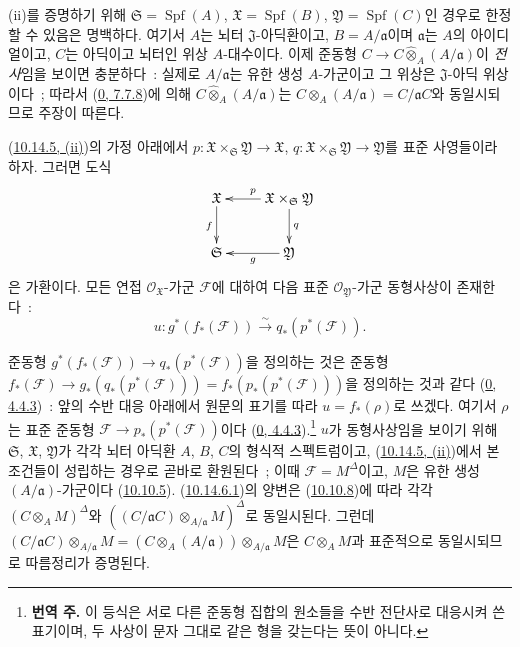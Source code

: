 (ii)를 증명하기 위해 $\mathfrak{S}=\operatorname{Spf}(A)$,
$\mathfrak{X}=\operatorname{Spf}(B)$,
$\mathfrak{Y}=\operatorname{Spf}(C)$인 경우로 한정할 수 있음은
명백하다. 여기서 $A$는 뇌터 $\mathfrak{J}$-아딕환이고,
$B=A/\mathfrak{a}$이며 $\mathfrak{a}$는 $A$의 아이디얼이고,
$C$는 아딕이고 뇌터인 위상 $A$-대수이다. 이제 준동형
$C\to C\widehat{\otimes}_A(A/\mathfrak{a})$이 \emph{전사}임을
보이면 충분하다~: 실제로 $A/\mathfrak{a}$는 유한 생성 $A$-가군이고
그 위상은 $\mathfrak{J}$-아딕 위상이다~; 따라서
(\hyperref[0.7.7.8-ko]{0, 7.7.8})에 의해
$C\widehat{\otimes}_A(A/\mathfrak{a})$는
$C\otimes_A(A/\mathfrak{a})=C/\mathfrak{a}C$와 동일시되므로 주장이
따른다.

\begin{corollary}[10.14.6]
\label{I.10.14.6-ko}
(\hyperref[I.10.14.5-ko]{10.14.5, (ii)})의 가정 아래에서
$p:\mathfrak{X}\times_{\mathfrak{S}}\mathfrak{Y}\to\mathfrak{X}$,
$q:\mathfrak{X}\times_{\mathfrak{S}}\mathfrak{Y}\to\mathfrak{Y}$를
표준 사영들이라 하자. 그러면 도식
\[
  \xymatrix{
    \mathfrak{X} \ar[d]_{f}
    & \mathfrak{X}\times_{\mathfrak{S}}\mathfrak{Y}
      \ar[l]_{p} \ar[d]^{q}\\
    \mathfrak{S}
    & \mathfrak{Y} \ar[l]^{g}
  }
\]
은 가환이다. 모든 연접 $\mathscr{O}_{\mathfrak{X}}$-가군
$\mathscr{F}$에 대하여 다음 표준 $\mathscr{O}_{\mathfrak{Y}}$-가군
동형사상이 존재한다~:
\[
  \label{I.10.14.6.1-ko}
  u:g^*(f_*(\mathscr{F}))
  \xrightarrow{\sim}
  q_*(p^*(\mathscr{F})).
  \tag{10.14.6.1}
\]
\end{corollary}

준동형 $g^*(f_*(\mathscr{F}))\to q_*(p^*(\mathscr{F}))$을 정의하는
것은 준동형
$f_*(\mathscr{F})\to g_*(q_*(p^*(\mathscr{F})))
=f_*(p_*(p^*(\mathscr{F})))$을 정의하는 것과 같다
(\hyperref[0.4.4.3-ko]{0, 4.4.3})~: 앞의 수반 대응 아래에서 원문의
표기를 따라 $u=f_*(\rho)$로 쓰겠다. 여기서 $\rho$는 표준 준동형
$\mathscr{F}\to p_*(p^*(\mathscr{F}))$이다
(\hyperref[0.4.4.3-ko]{0, 4.4.3}).\footnote{\textbf{번역 주.} 이
등식은 서로 다른 준동형 집합의 원소들을 수반 전단사로 대응시켜 쓴
표기이며, 두 사상이 문자 그대로 같은 형을 갖는다는 뜻이 아니다.}
$u$가 동형사상임을 보이기 위해 $\mathfrak{S}$, $\mathfrak{X}$,
$\mathfrak{Y}$가 각각 뇌터 아딕환 $A$, $B$, $C$의 형식적
스펙트럼이고, (\hyperref[I.10.14.5-ko]{10.14.5, (ii)})에서 본
조건들이 성립하는 경우로 곧바로 환원된다~; 이때
$\mathscr{F}=M^\Delta$이고, $M$은 유한 생성
$(A/\mathfrak{a})$-가군이다
(\hyperref[I.10.10.5-ko]{10.10.5}).
(\hyperref[I.10.14.6.1-ko]{10.14.6.1})의 양변은
(\hyperref[I.10.10.8-ko]{10.10.8})에 따라 각각
$(C\otimes_A M)^\Delta$와
$((C/\mathfrak{a}C)\otimes_{A/\mathfrak{a}}M)^\Delta$로 동일시된다.
그런데
$(C/\mathfrak{a}C)\otimes_{A/\mathfrak{a}}M
=(C\otimes_A(A/\mathfrak{a}))\otimes_{A/\mathfrak{a}}M$은
$C\otimes_A M$과 표준적으로 동일시되므로 따름정리가 증명된다.

